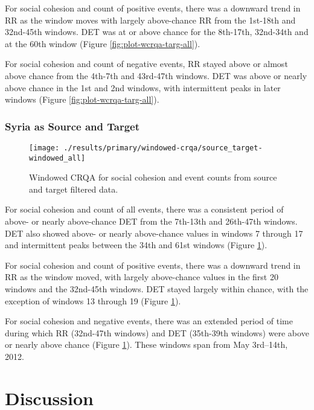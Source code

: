 \documentclass[english,man]{apa6}
\begin{document}
For social cohesion and count of positive events, there was a downward trend in RR
as the window moves with largely above-chance RR from the 1st-18th and
32nd-45th windows. DET was at or above chance for the 8th-17th,
32nd-34th and at the 60th window (Figure \ref{fig:plot-wcrqa-targ-all}).

For social cohesion and count of negative events, RR stayed above
or almost above chance from the 4th-7th and 43rd-47th windows. DET
was above or nearly above chance in the 1st and 2nd windows, with intermittent
peaks in later windows (Figure \ref{fig:plot-wcrqa-targ-all}).

\hypertarget{syria-as-source-and-target-1}{%
\subsubsection{Syria as Source and Target}\label{syria-as-source-and-target-1}}

\begin{figure}
\texttt{[image: ./results/primary/windowed-crqa/source\_target-windowed\_all]} \caption{Windowed CRQA for social cohesion and event counts from source and target filtered data.}\label{fig:plot-wcrqa-source-targ-all}
\end{figure}

For social cohesion and count of all events, there was a consistent period of
above- or nearly above-chance DET from the 7th-13th and 26th-47th
windows. DET also showed above- or nearly above-chance values in windows 7
through 17 and intermittent peaks between the 34th and 61st windows
(Figure \ref{fig:plot-wcrqa-source-targ-all}).

For social cohesion and count of
positive events, there was a downward trend in RR as the window moved, with
largely above-chance values in the first 20 windows and the 32nd-45th windows.
DET stayed largely within chance, with the exception of windows 13
through 19 (Figure \ref{fig:plot-wcrqa-source-targ-all}).

For social cohesion
and negative events, there was an extended period of time during which RR
(32nd-47th windows) and DET (35th-39th windows) were above or nearly above
chance (Figure \ref{fig:plot-wcrqa-source-targ-all}). These windows span from
May 3rd--14th, 2012.

\hypertarget{discussion}{%
\section{Discussion}\label{discussion}}
\end{document}
